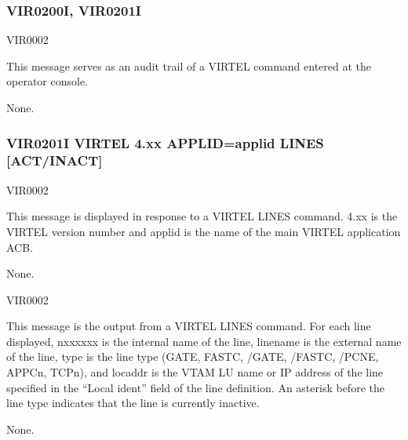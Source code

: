 \documentclass[letterpaper,10pt,english]{sphinxmanual}
\begin{document}
\subsubsection{VIR0200I, VIR0201I}
\label{\detokenize{messages:vir0200i-vir0201i}}\begin{description}
\sphinxAtStartPar
VIR0002

\sphinxAtStartPar
This message serves as an audit trail of a VIRTEL command entered at the operator console.

\sphinxAtStartPar
None.

\end{description}


\subsubsection{VIR0201I VIRTEL 4.xx APPLID=applid LINES {[}ACT/INACT{]}}
\label{\detokenize{messages:vir0201i-virtel-4-xx-applid-applid-lines-act-inact}}\begin{description}
\sphinxAtStartPar
VIR0002

\sphinxAtStartPar
This message is displayed in response to a VIRTEL LINES command. 4.xx is the VIRTEL version number and applid is the name of the main VIRTEL application ACB.

\sphinxAtStartPar
None.

\end{description}
\begin{description}
\sphinxAtStartPar
VIR0002

\sphinxAtStartPar
This message is the output from a VIRTEL LINES command. For each line displayed, n\sphinxhyphen{}xxxxxx is the internal name of the line, linename is the external name of the line, type is the line type (GATE, FASTC, /GATE, /FASTC, /PCNE, APPCn, TCPn), and locaddr is the VTAM LU name or IP address of the line specified in the “Local ident” field of the line definition. An asterisk before the line type indicates that the line is currently inactive.

\sphinxAtStartPar
None.

\end{description}
\end{document}
